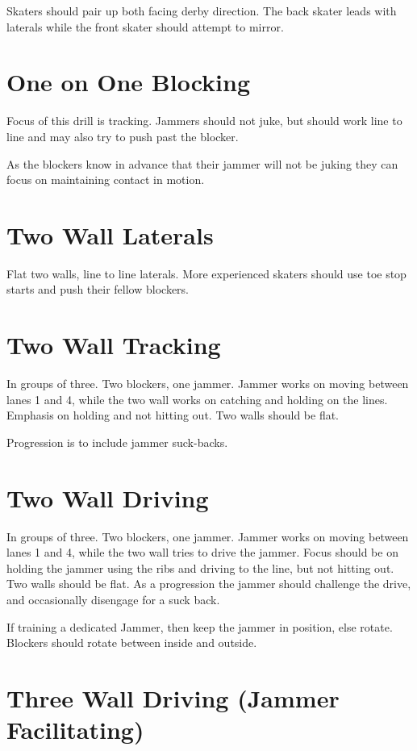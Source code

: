 \documentclass{journal}
\begin{document}
Skaters should pair up both facing derby direction.
The back skater leads with laterals while the front skater should attempt to mirror. 

\section*{One on One Blocking}
\label{drill:blocking:one_on_one}
Focus of this drill is tracking. Jammers should not juke, but should work line to line and may also try to push past the blocker.

As the blockers know in advance that their jammer will not be juking they can focus on maintaining contact in motion.  


\section*{Two Wall Laterals}
\label{drill:two_wall:laterals}

Flat two walls, line to line laterals.  
More experienced skaters should use toe stop starts and push their fellow blockers.  

\section*{Two Wall Tracking}
\label{drill:two_wall:tracking}
In groups of three. 
Two blockers, one jammer.
Jammer works on moving between lanes 1 and 4, while the two wall works on catching and holding on the lines.
Emphasis on holding and not hitting out.      
Two walls should be flat.

Progression is to include jammer suck-backs.


\section*{Two Wall Driving}
\label{drill:two_wall:driving}
In groups of three. 
Two blockers, one jammer.
Jammer works on moving between lanes 1 and 4, while the two wall tries to drive the jammer.  
Focus should be on holding the jammer using the ribs and driving to the line, but not hitting out. 
Two walls should be flat.
As a progression the jammer should challenge the drive, and occasionally disengage for a suck back.

If training a dedicated Jammer, then keep the jammer in position, else rotate.
Blockers should rotate between inside and outside. 

\section*{Three Wall Driving (Jammer Facilitating)}
\label{drill:three_wall:driving_facilitated}
\end{document}
